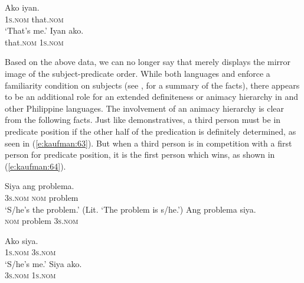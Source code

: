 \documentclass[output=paper]{langsci/langscibook}
\begin{document}
\begin{exe}
	\ex\label{e:kaufman:62}
	\begin{xlist}
		\ex\label{e:kaufman:62a}
        \gll Ako iyan.\\
		\textsc{1s.nom} that.\textsc{nom}\\
		\glt `That's me.'
		\ex\label{e:kaufman:62b}
        \gll {\USQMark}{\USStar}Iyan ako.\\
		\phantom{?*}that.\textsc{nom} \textsc{1s.nom}\\
	\end{xlist}
\end{exe}

\noindent
Based on the above data, we can no longer say that  merely displays the mirror image of the  subject-predicate order. While both  languages and  enforce a familiarity condition on subjects (see \citealt[][chap.8]{Mikkelsen:2005}, for a summary of the  facts), there appears to be an additional role for an extended definiteness or animacy hierarchy in  and other Philippine languages. The involvement of an animacy hierarchy is clear from the following facts. Just like demonstratives, a third person  must be in predicate position if the other half of the predication is definitely determined, as seen in (\ref{e:kaufman:63}). But when a third person  is in competition with a first person  for predicate position, it is the first person which wins, as shown in (\ref{e:kaufman:64}).

\begin{exe}
	\ex\label{e:kaufman:63}
	\begin{xlist}
		\ex\label{e:kaufman:63a}
        \gll Siya ang problema.\\
		\textsc{3s.nom} \textsc{nom} problem\\
		\glt `S/he's the problem.' (Lit. `The problem is s/he.')
		\ex\label{e:kaufman:63b}
        \gll {\USStar}Ang problema siya.\\
		\phantom{*}\textsc{nom} problem \textsc{3s.nom}\\
	\end{xlist}
\end{exe}

\begin{exe}
	\ex\label{e:kaufman:64}
	\begin{xlist}
		\ex\label{e:kaufman:64a}
        \gll Ako siya.\\
		\textsc{1s.nom} \textsc{3s.nom}\\
		\glt `S/he's me.'
		\ex\label{e:kaufman:64b}
        \gll {\USStar}Siya ako.\\
		\phantom{*}\textsc{3s.nom} \textsc{1s.nom}\\
	\end{xlist}
\end{exe}
\end{document}
